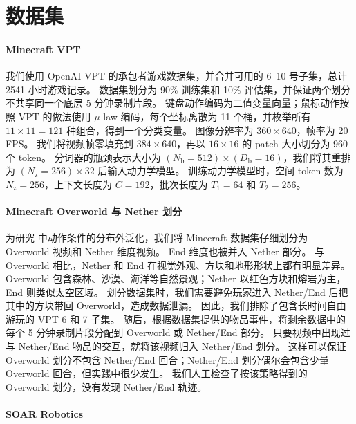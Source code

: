 
\section{数据集}

\paragraph{Minecraft VPT}

我们使用 OpenAI VPT 的承包者游戏数据集\citep{vpt}，并合并可用的 6--10 号子集，总计 2541 小时游戏记录。
数据集划分为 90\% 训练集和 10\% 评估集，并保证两个划分不共享同一个底层 5 分钟录制片段。
键盘动作编码为二值变量向量；鼠标动作按照 VPT 的做法使用 $\mu$-law 编码，每个坐标离散为 11 个桶，并枚举所有 $11 \times 11 = 121$ 种组合，得到一个分类变量。
图像分辨率为 $360 \times 640$，帧率为 20 FPS。
我们将视频帧零填充到 $384 \times 640$，再以 $16 \times 16$ 的 patch 大小切分为 960 个 token。
分词器的瓶颈表示大小为 $(N_\mathrm{b} = 512) \times (D_\mathrm{b} = 16)$，我们将其重排为 $(N_\mathrm{z} = 256) \times 32$ 后输入动力学模型。
训练动力学模型时，空间 token 数为 $N_\mathrm{z} = 256$，上下文长度为 $C = 192$，批次长度为 $T_1 = 64$ 和 $T_2 = 256$。

\paragraph{Minecraft Overworld 与 Nether 划分}

为研究 \method 中动作条件的分布外泛化，我们将 Minecraft 数据集仔细划分为 Overworld 视频和 Nether 维度视频。
End 维度也被并入 Nether 部分。
与 Overworld 相比，Nether 和 End 在视觉外观、方块和地形形状上都有明显差异。
Overworld 包含森林、沙漠、海洋等自然景观；Nether 以红色方块和熔岩为主，End 则类似太空区域。
划分数据集时，我们需要避免玩家进入 Nether/End 后把其中的方块带回 Overworld，造成数据泄漏。
因此，我们排除了包含长时间自由游玩的 VPT 6 和 7 子集。
随后，根据数据集提供的物品事件，将剩余数据中的每个 5 分钟录制片段分配到 Overworld 或 Nether/End 部分。
只要视频中出现过与 Nether/End 物品的交互，就将该视频归入 Nether/End 划分。
这样可以保证 Overworld 划分不包含 Nether/End 回合；Nether/End 划分偶尔会包含少量 Overworld 回合，但实践中很少发生。
我们人工检查了按该策略得到的 Overworld 划分，没有发现 Nether/End 轨迹。

\paragraph{SOAR Robotics}

